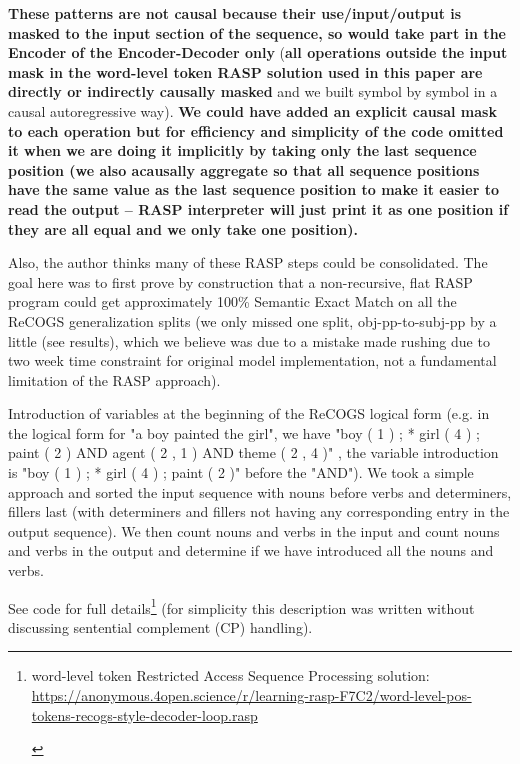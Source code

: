 \documentclass[11pt]{article}
\begin{document}
\textbf{These patterns are not causal because their use/input/output is masked to the input section of the sequence, so would take part in the Encoder of the Encoder-Decoder only} (\textbf{all operations outside the input mask in the word-level token RASP solution used in this paper are directly or indirectly causally masked} and we built symbol by symbol in a causal autoregressive way). \textbf{We could have added an explicit causal mask to each operation but for efficiency and simplicity of the code omitted it when we are doing it implicitly by taking only the last sequence position (we also acausally aggregate so that all sequence positions have the same value as the last sequence position to make it easier to read the output -- RASP interpreter will just print it as one position if they are all equal and we only take one position).}

Also, the author thinks many of these RASP steps could be consolidated. The goal here was to first prove by construction that a non-recursive, flat RASP program could get approximately 100\% Semantic Exact Match on all the ReCOGS generalization splits (we only missed one split, obj-pp-to-subj-pp by a little (see results), which we believe was due to a mistake made rushing due to two week time constraint for original model implementation, not a fundamental limitation of the RASP approach).

Introduction of variables at the beginning of the ReCOGS logical form (e.g. in the logical form for "a boy painted the girl", we have "boy ( 1 ) ; * girl ( 4 ) ; paint ( 2 ) AND agent ( 2 , 1 ) AND theme ( 2 , 4 )" , the variable introduction is "boy ( 1 ) ; * girl ( 4 ) ; paint ( 2 )" before the "AND"). We took a simple approach and sorted the input sequence with nouns before verbs and determiners, fillers last (with determiners and fillers not having any corresponding entry in the output sequence). We then count nouns and verbs in the input and count nouns and verbs in the output and determine if we have introduced all the nouns and verbs.

See code for full details\footnote{\begin{footnotesize}word-level token Restricted Access Sequence Processing solution: \href{https://anonymous.4open.science/r/learning-rasp-F7C2/word-level-pos-tokens-recogs-style-decoder-loop.rasp}{https://anonymous.4open.science/r/learning-rasp-F7C2/word-level-pos-tokens-recogs-style-decoder-loop.rasp} \end{footnotesize}} (for simplicity this description was written without discussing sentential complement (CP) handling).
\end{document}
